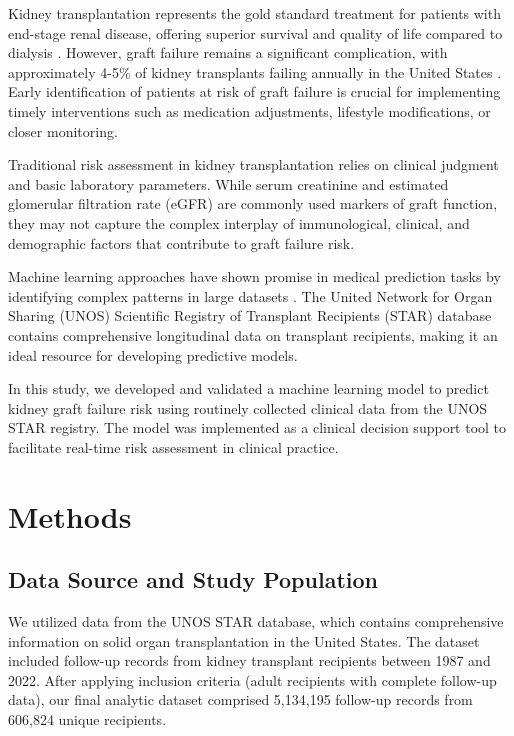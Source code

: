 \documentclass[12pt,a4paper]{article}
\begin{document}
Kidney transplantation represents the gold standard treatment for patients with end-stage renal disease, offering superior survival and quality of life compared to dialysis \citep{Wolfe1999}. However, graft failure remains a significant complication, with approximately 4-5\% of kidney transplants failing annually in the United States \citep{OPTN2023}. Early identification of patients at risk of graft failure is crucial for implementing timely interventions such as medication adjustments, lifestyle modifications, or closer monitoring.

Traditional risk assessment in kidney transplantation relies on clinical judgment and basic laboratory parameters. While serum creatinine and estimated glomerular filtration rate (eGFR) are commonly used markers of graft function, they may not capture the complex interplay of immunological, clinical, and demographic factors that contribute to graft failure risk.

Machine learning approaches have shown promise in medical prediction tasks by identifying complex patterns in large datasets \citep{Beam2018}. The United Network for Organ Sharing (UNOS) Scientific Registry of Transplant Recipients (STAR) database contains comprehensive longitudinal data on transplant recipients, making it an ideal resource for developing predictive models.

In this study, we developed and validated a machine learning model to predict kidney graft failure risk using routinely collected clinical data from the UNOS STAR registry. The model was implemented as a clinical decision support tool to facilitate real-time risk assessment in clinical practice.

\section{Methods}

\subsection{Data Source and Study Population}

We utilized data from the UNOS STAR database, which contains comprehensive information on solid organ transplantation in the United States. The dataset included follow-up records from kidney transplant recipients between 1987 and 2022. After applying inclusion criteria (adult recipients with complete follow-up data), our final analytic dataset comprised 5,134,195 follow-up records from 606,824 unique recipients.
\end{document}
